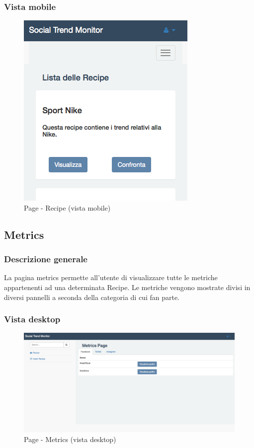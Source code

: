 		\subsubsection{Vista mobile} %
		\begin{figure}[htbp]
			\centering
			\centerline{\includegraphics[scale=0.5]{./images/mockup/recipe_vm.png}}
			\caption{Page - Recipe (vista mobile)}
		\end{figure}

	\subsection{Metrics} %
	\label{sub:metrics}
		\subsubsection{Descrizione generale} %
		La pagina metrics permette all'utente di visualizzare tutte le metriche appartenenti ad una determinata Recipe. Le metriche vengono mostrate divisi in diversi pannelli a seconda della categoria di cui fan parte.

		\subsubsection{Vista desktop} %
		\begin{figure}[htbp]
			\centering
			\centerline{\includegraphics[scale=0.4]{./images/mockup/metrics_vd.pdf}}
			\caption{Page - Metrics (vista desktop)}
		\end{figure}

